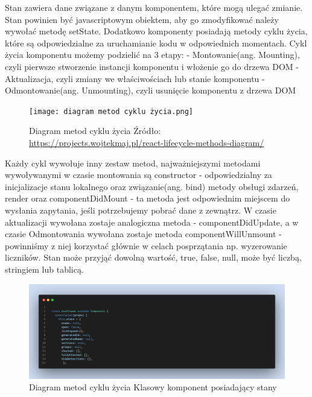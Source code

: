 \documentclass[oneside,polski,logo,indent]{amuthesis}
\begin{document}
\begin{enumerate}
\begin{enumerate}
{Stan zawiera dane związane z danym komponentem, które mogą ulegać zmianie. Stan powinien być javascriptowym obiektem, aby go zmodyfikować należy wywołać metodę setState. Dodatkowo komponenty posiadają metody cyklu życia, które są odpowiedzialne za uruchamianie kodu w odpowiednich momentach.
\newline
Cykl życia komponentu możemy podzielić na 3 etapy:
\newline- Montowanie(ang. Mounting), czyli pierwsze stworzenie instancji komponentu i włożenie go do drzewa DOM
\newline- Aktualizacja, czyli zmiany we właściwościach lub stanie komponentu
\newline- Odmontowanie(ang. Unmounting), czyli usunięcie komponentu z drzewa DOM
\begin{figure}[H]
\centering
\texttt{[image: diagram metod cyklu życia.png]}
\caption{Diagram metod cyklu życia
\newline
Źródło: \url{https://projects.wojtekmaj.pl/react-lifecycle-methods-diagram/}
}
\label{metody cyklu zycia}
\end{figure}
Każdy cykl wywołuje inny zestaw metod, najważniejszymi metodami wywoływanymi w czasie montowania są constructor - odpowiedzialny za inicjalizacje stanu lokalnego oraz związanie(ang. bind) metody obsługi zdarzeń, render oraz componentDidMount - ta metoda jest odpowiednim miejscem do wysłania zapytania, jeśli potrzebujemy pobrać dane z zewnątrz.
W czasie aktualizacji wywołana zostaje analogiczna metoda - componentDidUpdate, a w czasie Odmontowania wywołana zostaje metoda componentWillUnmount - powinniśmy z niej korzystać głównie w celach posprzątania np. wyzerowanie liczników.
\newline
\newline
Stan może przyjąć dowolną wartość, true, false, null, może być liczbą, stringiem lub tablicą.
\begin{figure}[H]
\centering
\includegraphics[width=13cm]{class comp i stan.png}
\caption{Diagram metod cyklu życia
Klasowy komponent posiadający stany
}
\label{metody cyklu zycia}
\end{figure}

}
\end{enumerate}
\end{enumerate}
\end{document}
